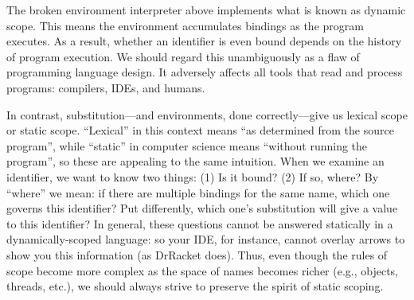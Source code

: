 
The broken environment interpreter above implements what is known as dynamic
scope. This means the environment accumulates bindings as the program executes.
As a result, whether an identifier is even bound depends on the history of
program execution. We should regard this unambiguously as a flaw of programming
language design. It adversely affects all tools that read and process programs:
compilers, IDEs, and humans.

In contrast, substitution—and environments, done correctly—give us lexical scope
or static scope. “Lexical” in this context means “as determined from the source program”, while “static” in computer science means “without running the program”, so these are appealing to the same intuition. When we examine an identifier, we want to know two things: (1) Is it bound? (2) If so, where? By “where” we mean: if there are multiple bindings for the same name, which one governs this identifier? Put differently, which one’s substitution will give a value to this identifier? In general, these questions cannot be answered statically in a dynamically-scoped language: so your IDE, for instance, 
cannot overlay arrows to show you this information (as DrRacket does).
Thus, even though the rules of scope become more complex as the space of names
becomes richer (e.g., objects, threads, etc.), we should always strive to preserve the spirit of static 
scoping.

\secdown
{}
\secup

